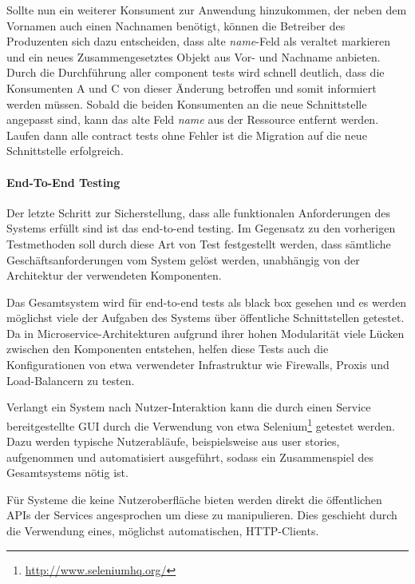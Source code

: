 \documentclass[12pt,a4paper,bibliography=totocnumbered,listof=totocnumbered]{scrartcl}
\begin{document}
Sollte nun ein weiterer Konsument zur Anwendung hinzukommen, der neben dem Vornamen auch einen Nachnamen benötigt, können die Betreiber des Produzenten sich dazu entscheiden, dass alte \textit{name}-Feld als veraltet markieren und ein neues Zusammengesetztes Objekt aus Vor- und Nachname anbieten. Durch die Durchführung aller component tests wird schnell deutlich, dass die Konsumenten A und C von dieser Änderung betroffen und somit informiert werden müssen. Sobald die beiden Konsumenten an die neue Schnittstelle angepasst sind, kann das alte Feld \textit{name} aus der Ressource entfernt werden. Laufen dann alle contract tests ohne Fehler ist die Migration auf die neue Schnittstelle erfolgreich.\cite{clemson}

\paragraph{End-To-End Testing}

Der letzte Schritt zur Sicherstellung, dass alle funktionalen Anforderungen des Systems erfüllt sind ist das end-to-end testing. Im Gegensatz zu den vorherigen Testmethoden soll durch diese Art von Test festgestellt werden, dass sämtliche Geschäftsanforderungen vom System gelöst werden, unabhängig von der Architektur der verwendeten Komponenten.\cite{clemson}

Das Gesamtsystem wird für end-to-end tests als black box gesehen und es werden möglichst viele der Aufgaben des Systems über öffentliche Schnittstellen getestet. Da in Microservice-Architekturen aufgrund ihrer hohen Modularität viele Lücken zwischen den Komponenten entstehen, helfen diese Tests auch die Konfigurationen von etwa verwendeter Infrastruktur wie Firewalls, Proxis und Load-Balancern zu testen.\cite{clemson}

Verlangt ein System nach Nutzer-Interaktion kann die durch einen Service bereitgestellte GUI durch die Verwendung von etwa Selenium\footnote{\url{http://www.seleniumhq.org/}} getestet werden. Dazu werden typische Nutzerabläufe, beispielsweise aus user stories, aufgenommen und automatisiert ausgeführt, sodass ein Zusammenspiel des Gesamtsystems nötig ist.\cite{clemson}

Für Systeme die keine Nutzeroberfläche bieten werden direkt die öffentlichen \acp{API} der Services angesprochen um diese zu manipulieren. Dies geschieht durch die Verwendung eines, möglichst automatischen, HTTP-Clients.\cite{clemson}

\end{document}
